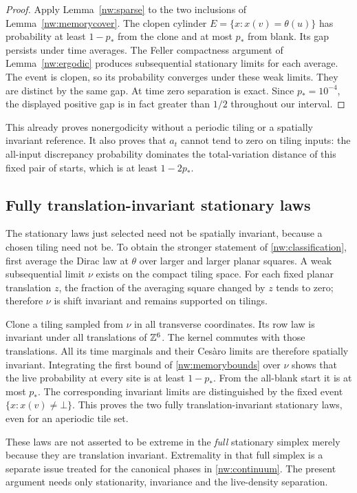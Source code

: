 \begin{proof}
Apply Lemma~\ref{nw:sparse} to the two inclusions of Lemma~\ref{nw:memorycover}. The clopen cylinder
$E=\{x:x(v)=\theta(u)\}$ has probability at least $1-p_*$ from the clone and at most $p_*$ from
blank. Its gap persists under time averages. The Feller compactness argument of
Lemma~\ref{nw:ergodic} produces subsequential stationary limits for each average. The event is
clopen, so its probability converges under these weak limits. They are distinct by the same gap. At
time zero separation is exact. Since $p_*=10^{-4}$, the displayed positive gap is in fact greater
than $1/2$ throughout our interval.
\end{proof}

This already proves nonergodicity without a periodic tiling or a spatially invariant reference. It also proves that $a_t$ cannot tend to zero on tiling inputs: the all-input discrepancy probability dominates the total-variation distance of this fixed pair of starts, which is at least $1-2p_*$.

\subsection{Fully translation-invariant stationary laws}

The stationary laws just selected need not be spatially invariant, because a chosen tiling need not be. To obtain the stronger statement of \cref{nw:classification}, first average the Dirac law at $\theta$ over larger and larger planar squares. A weak subsequential limit $\nu$ exists on the compact tiling space. For each fixed planar translation $z$, the fraction of the averaging square changed by $z$ tends to zero; therefore $\nu$ is shift invariant and remains supported on tilings.

Clone a tiling sampled from $\nu$ in all transverse coordinates. Its row law is invariant under all translations of $\mathbb{Z}^6$. The kernel commutes with those translations. All its time marginals and their Ces\`aro limits are therefore spatially invariant. Integrating the first bound of \eqref{nw:memorybounds} over $\nu$ shows that the live probability at every site is at least $1-p_*$. From the all-blank start it is at most $p_*$. The corresponding invariant limits are distinguished by the fixed event $\{x:x(v)\ne\bot\}$. This proves the two fully translation-invariant stationary laws, even for an aperiodic tile set.

These laws are not asserted to be extreme in the \emph{full} stationary simplex merely because they are translation invariant. Extremality in that full simplex is a separate issue treated for the canonical phases in \cref{nw:continuum}. The present argument needs only stationarity, invariance and the live-density separation.

